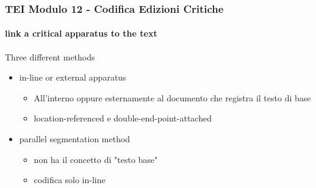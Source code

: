 \begin{frame}
    \frametitle{TEI Modulo 12 - Codifica Edizioni Critiche}
    \framesubtitle{link a critical apparatus to the text}
    \addtocounter{nframe}{1}








    
    \begin{block}{Three different methods}
       \begin{itemize}
           \item in-line or external apparatus
           \begin{itemize}
             \item All'interno oppure esternamente al documento che registra il testo di base
             \item location-referenced e double-end-point-attached
           \end{itemize}
           \item  parallel segmentation method
            \begin{itemize}
                \item non ha il concetto di "testo base"
                \item codifica solo in-line
            \end{itemize}
       \end{itemize}
     \end{block}

\end{frame}



